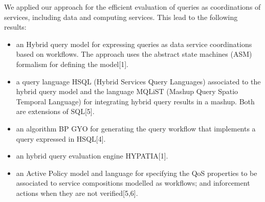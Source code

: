 We  applied our approach for the efficient evaluation  of queries as coordinations of services, including data  and computing services.  
This lead to the following results: 
\begin{itemize}
\item  an Hybrid query model for expressing queries as data service coordinations based on workflows. The approach uses the abstract state machines (ASM) formalism for defining the model[1].

\item  a query language HSQL (Hybrid Services Query Languages) associated to the hybrid query model and the language MQLiST (Mashup Query Spatio Temporal Language) for integrating hybrid query results in a mashup. Both are extensions of SQL[5]. 

\item  an algorithm BP GYO for generating the query workflow that implements a query expressed in HSQL[4].


\item an hybrid query evaluation engine HYPATIA[1].

\item an Active Policy model and language for specifying the QoS properties to be associated to service compositions modelled as workflows; and inforcement actions when they are not verified[5,6].

\end{itemize}


